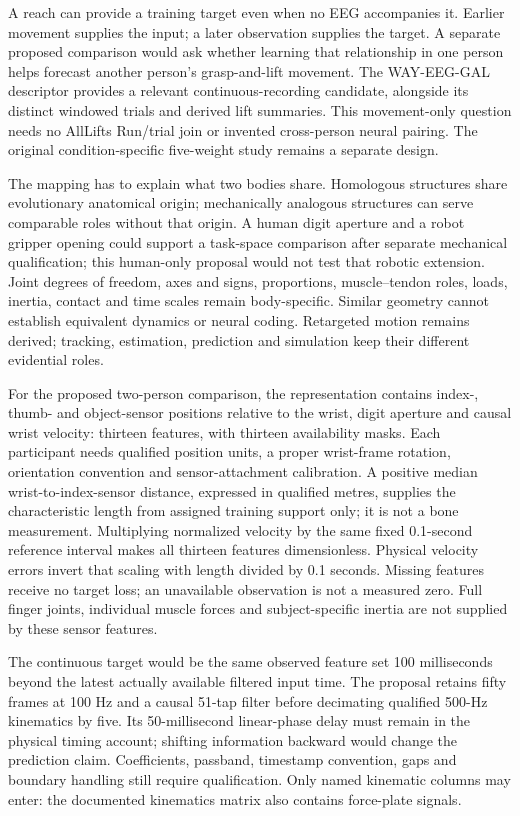 A reach can provide a training target even when no EEG accompanies it. Earlier movement supplies the input; a later observation supplies the target. A separate proposed comparison would ask whether learning that relationship in one person helps forecast another person's grasp-and-lift movement. The WAY-EEG-GAL descriptor provides a relevant continuous-recording candidate, alongside its distinct windowed trials and derived lift summaries.\citep{luciw2014way} This movement-only question needs no AllLifts Run/trial join or invented cross-person neural pairing. The original condition-specific five-weight study remains a separate design.

The mapping has to explain what two bodies share. Homologous structures share evolutionary anatomical origin; mechanically analogous structures can serve comparable roles without that origin. A human digit aperture and a robot gripper opening could support a task-space comparison after separate mechanical qualification; this human-only proposal would not test that robotic extension. Joint degrees of freedom, axes and signs, proportions, muscle--tendon roles, loads, inertia, contact and time scales remain body-specific. Similar geometry cannot establish equivalent dynamics or neural coding. Retargeted motion remains derived; tracking, estimation, prediction and simulation keep their different evidential roles.

For the proposed two-person comparison, the representation contains index-, thumb- and object-sensor positions relative to the wrist, digit aperture and causal wrist velocity: thirteen features, with thirteen availability masks. Each participant needs qualified position units, a proper wrist-frame rotation, orientation convention and sensor-attachment calibration. A positive median wrist-to-index-sensor distance, expressed in qualified metres, supplies the characteristic length from assigned training support only; it is not a bone measurement. Multiplying normalized velocity by the same fixed 0.1-second reference interval makes all thirteen features dimensionless. Physical velocity errors invert that scaling with length divided by 0.1 seconds. Missing features receive no target loss; an unavailable observation is not a measured zero. Full finger joints, individual muscle forces and subject-specific inertia are not supplied by these sensor features.

The continuous target would be the same observed feature set 100 milliseconds beyond the latest actually available filtered input time. The proposal retains fifty frames at 100 Hz and a causal 51-tap filter before decimating qualified 500-Hz kinematics by five. Its 50-millisecond linear-phase delay must remain in the physical timing account; shifting information backward would change the prediction claim. Coefficients, passband, timestamp convention, gaps and boundary handling still require qualification. Only named kinematic columns may enter: the documented kinematics matrix also contains force-plate signals.


